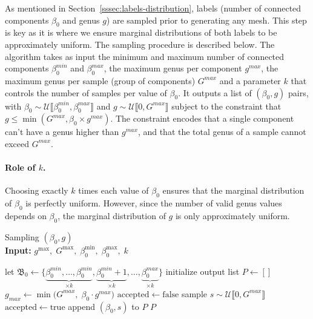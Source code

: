 As mentioned in Section~\ref{sssec:labels-distribution}, labels (number of connected components $\beta_0$ and genus $g$) are sampled prior to generating any mesh. This step is key as it is where we ensure marginal distributions of both labels to be approximately uniform. The sampling procedure is described below. The algorithm takes as input the minimum and maximum number of connected components $\beta_0^{min}$ and $\beta_0^{max}$, the maximum genus per component $g^{max}$, the maximum genus per sample (group of components) $G^{max}$ and a parameter $k$ that controls the number of samples per value of $\beta_0$. It outputs a list of $(\beta_0, g)$ pairs, with $\beta_0\sim\mathcal{U}\llbracket \beta_0^{min}, \beta_0^{max} \rrbracket$ and $g\sim\mathcal{U}\llbracket 0, G^{max} \rrbracket$ subject to the constraint that $g \leq \min(G^{max}, \beta_0 \times g^{max})$. The constraint encodes that a single component can't have a genus higher than $g^{max}$, and that the total genus of a sample cannot exceed $G^{max}$. 

\paragraph{Role of $k$.} 
Choosing exactly $k$ times each value of $\beta_0$ ensures that the marginal distribution of $\beta_0$ is perfectly uniform. However, since the number of valid genus values depends on $\beta_0$, the marginal distribution of $g$ is only approximately uniform.


\begin{algorithm}
  \caption{Sampling $(\beta_0, g)$ \\ 
  \textbf{Input:} $g^{\max},\; G^{\max},\; \beta_0^{\min},\; \beta_0^{\max},\; k$} \label{alg:topogen-labels-sampling}

  \begin{algorithmic}[ ] %
    \State let $\mathfrak{B}_0 \gets \{\underbrace{\beta_0^{min}, \dots, \beta_0^{min}}_{\times k}, \underbrace{\beta_0^{min}+1}_{\times k}, \dots, \underbrace{\beta_0^{max}}_{\times k}\}$
    \State initialize output list $P \gets []$
      \State $g_{max} \gets \min\big(G^{max},\; \beta_0 \cdot g^{max}\big)$
      \State $\mathrm{accepted} \gets \mathrm{false}$
        \State sample $s \sim \mathcal{U}\llbracket 0, G^{max} \rrbracket$
          \State $\mathrm{accepted} \gets \mathrm{true}$
        \EndIf
      \EndWhile
      \State append $(\beta_0, s)$ to $P$
    \EndFor
    \Statex
    \Return $P$
  \end{algorithmic} 
\end{algorithm}

